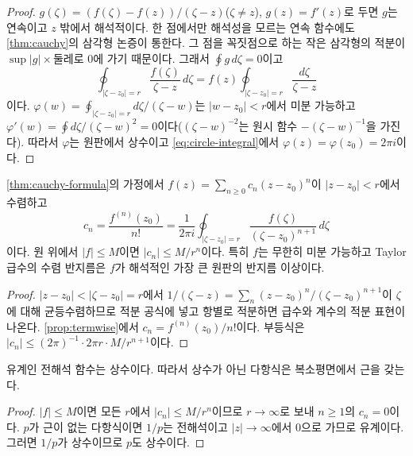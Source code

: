 \begin{proof}
$g(\zeta)=(f(\zeta)-f(z))/(\zeta-z)$($\zeta\ne z$), $g(z)=f'(z)$로 두면 $g$는 연속이고 $z$ 밖에서 해석적이다. 한 점에서만 해석성을 모르는 연속 함수에도 \cref{thm:cauchy}의 삼각형 논증이 통한다. 그 점을 꼭짓점으로 하는 작은 삼각형의 적분이 $\sup|g|\times$둘레로 $0$에 가기 때문이다. 그래서 $\oint g\,d\zeta=0$이고
\[
\oint_{|\zeta-z_0|=r}\frac{f(\zeta)}{\zeta-z}\,d\zeta=f(z)\oint_{|\zeta-z_0|=r}\frac{d\zeta}{\zeta-z}
\]
이다. $\varphi(w)=\oint_{|\zeta-z_0|=r}d\zeta/(\zeta-w)$는 $|w-z_0|<r$에서 미분 가능하고 $\varphi'(w)=\oint d\zeta/(\zeta-w)^2=0$이다($(\zeta-w)^{-2}$는 원시 함수 $-(\zeta-w)^{-1}$을 가진다). 따라서 $\varphi$는 원판에서 상수이고 \cref{eq:circle-integral}에서 $\varphi(z)=\varphi(z_0)=2\pi i$이다.
\end{proof}

\begin{corollary}
\label{cor:cauchy-estimates}
\cref{thm:cauchy-formula}의 가정에서 $f(z)=\sum_{n\ge0}c_n(z-z_0)^n$이 $|z-z_0|<r$에서 수렴하고
\begin{equation}
\label{eq:taylor-coeff}
c_n=\frac{f^{(n)}(z_0)}{n!}=\frac{1}{2\pi i}\oint_{|\zeta-z_0|=r}\frac{f(\zeta)}{(\zeta-z_0)^{n+1}}\,d\zeta
\end{equation}
이다. 원 위에서 $|f|\le M$이면 $|c_n|\le M/r^n$이다. 특히 $f$는 무한히 미분 가능하고 Taylor 급수의 수렴 반지름은 $f$가 해석적인 가장 큰 원판의 반지름 이상이다.
\end{corollary}

\begin{proof}
$|z-z_0|<|\zeta-z_0|=r$에서 $1/(\zeta-z)=\sum_n(z-z_0)^n/(\zeta-z_0)^{n+1}$이 $\zeta$에 대해 균등수렴하므로 적분 공식에 넣고 항별로 적분하면 급수와 계수의 적분 표현이 나온다. \cref{prop:termwise}에서 $c_n=f^{(n)}(z_0)/n!$이다. 부등식은 $|c_n|\le(2\pi)^{-1}\cdot2\pi r\cdot M/r^{n+1}$이다.
\end{proof}

\begin{corollary}[Liouville]
\label{cor:liouville}
유계인 전해석 함수는 상수이다. 따라서 상수가 아닌 다항식은 복소평면에서 근을 갖는다.
\end{corollary}

\begin{proof}
$|f|\le M$이면 모든 $r$에서 $|c_n|\le M/r^n$이므로 $r\to\infty$로 보내 $n\ge1$의 $c_n=0$이다. $p$가 근이 없는 다항식이면 $1/p$는 전해석이고 $|z|\to\infty$에서 $0$으로 가므로 유계이다. 그러면 $1/p$가 상수이므로 $p$도 상수이다.
\end{proof}

